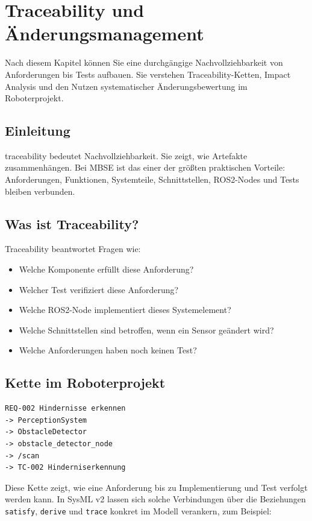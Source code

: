 \chapter{Traceability und Änderungsmanagement}

\begin{lernziele}
Nach diesem Kapitel können Sie eine durchgängige Nachvollziehbarkeit von Anforderungen bis Tests aufbauen. Sie verstehen Traceability-Ketten, Impact Analysis und den Nutzen systematischer Änderungsbewertung im Roboterprojekt.
\end{lernziele}

\section{Einleitung}
\gls{traceability} bedeutet Nachvollziehbarkeit. Sie zeigt, wie Artefakte zusammenhängen. Bei MBSE ist das einer der größten praktischen Vorteile: Anforderungen, Funktionen, Systemteile, Schnittstellen, ROS2-Nodes und Tests bleiben verbunden.

\section{Was ist Traceability?}
Traceability beantwortet Fragen wie:

\begin{itemize}
    \item Welche Komponente erfüllt diese Anforderung?
    \item Welcher Test verifiziert diese Anforderung?
    \item Welche ROS2-Node implementiert dieses Systemelement?
    \item Welche Schnittstellen sind betroffen, wenn ein Sensor geändert wird?
    \item Welche Anforderungen haben noch keinen Test?
\end{itemize}

\section{Kette im Roboterprojekt}
\begin{lstlisting}[style=plaintext]
REQ-002 Hindernisse erkennen
-> PerceptionSystem
-> ObstacleDetector
-> obstacle_detector_node
-> /scan
-> TC-002 Hinderniserkennung
\end{lstlisting}

Diese Kette zeigt, wie eine Anforderung bis zu Implementierung und Test verfolgt werden kann. In SysML v2 lassen sich solche Verbindungen über die Beziehungen \texttt{satisfy}, \texttt{derive} und \texttt{trace} konkret im Modell verankern, zum Beispiel:

